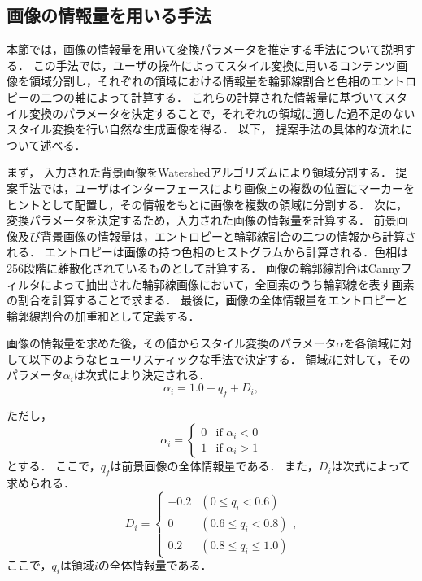 \documentclass[twocolumn,a4j,dvipdfmx]{jsarticle_customized1}
\begin{document}
\subsection{画像の情報量を用いる手法}\label{sec:teian1}
本節では，画像の情報量を用いて変換パラメータを推定する手法について説明する．
この手法では，ユーザの操作によってスタイル変換に用いるコンテンツ画像を領域分割し，それぞれの領域における情報量を輪郭線割合と色相のエントロピーの二つの軸によって計算する．
これらの計算された情報量に基づいてスタイル変換のパラメータを決定することで，それぞれの領域に適した過不足のないスタイル変換を行い自然な生成画像を得る．
以下， 提案手法の具体的な流れについて述べる．

まず， 入力された背景画像をWatershedアルゴリズムにより領域分割する．
提案手法では，ユーザはインターフェースにより画像上の複数の位置にマーカーをヒントとして配置し，その情報をもとに画像を複数の領域に分割する．
次に， 変換パラメータを決定するため，入力された画像の情報量を計算する．
前景画像及び背景画像の情報量は，エントロピーと輪郭線割合の二つの情報から計算される．
エントロピーは画像の持つ色相のヒストグラムから計算される．色相は256段階に離散化されているものとして計算する．
画像の輪郭線割合はCannyフィルタによって抽出された輪郭線画像において，全画素のうち輪郭線を表す画素の割合を計算することで求まる．
最後に，画像の全体情報量をエントロピーと輪郭線割合の加重和として定義する．

画像の情報量を求めた後，その値からスタイル変換のパラメータ$\alpha$を各領域に対して以下のようなヒューリスティックな手法で決定する．
領域$i$に対して，そのパラメータ$\alpha_i$は次式により決定される．
\begin{equation}
    \alpha_i = 1.0 - q_f + D_i,
    \label{equ:alpha:1}
\end{equation}

ただし，
\begin{equation}
    \alpha_i = \begin{cases} 
    0 & \text{if } \alpha_i < 0 \\
    1 & \text{if } \alpha_i > 1
    \end{cases}
\end{equation}
とする．
ここで，$q_f$は前景画像の全体情報量である．
また，$D_i$は次式によって求められる．
\begin{equation}
D_i = 
\begin{cases}
 -0.2 & (0 \leq q_i < 0.6) \\
 0 & (0.6 \leq q_i < 0.8) \\
 0.2 & (0.8 \leq q_i \leq 1.0)
\end{cases},
\label{equ:alpha:2}
\end{equation}
ここで，$q_i$は領域$i$の全体情報量である．
\end{document}
